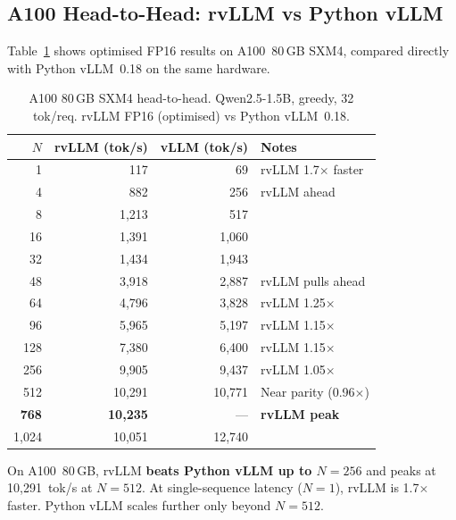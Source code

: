 \documentclass[11pt,a4paper]{article}
\newcommand{\thead}[1]{\textbf{#1}}
\begin{document}
\subsection{A100 Head-to-Head: rvLLM vs Python vLLM}

Table~\ref{tab:a100} shows optimised FP16 results on A100~80\,GB SXM4, compared
directly with Python vLLM~0.18 on the same hardware.

\begin{table}[t]
  \centering
  \caption{A100 80\,GB SXM4 head-to-head. Qwen2.5-1.5B, greedy, 32 tok/req. rvLLM FP16 (optimised) vs Python vLLM~0.18.}
  \label{tab:a100}
  \small
  \begin{tabular}{@{}rrrp{3.5cm}@{}}
    \toprule
    \rowcolor{HeaderBlue} \thead{$N$} & \thead{rvLLM (tok/s)} & \thead{vLLM (tok/s)} & \thead{Notes} \\
    \midrule
    1    & 117    & 69     & rvLLM 1.7$\times$ faster \\
    \rowcolor{gray!8}
    4    & 882    & 256    & rvLLM ahead \\
    8    & 1{,}213 & 517   & \\
    \rowcolor{gray!8}
    16   & 1{,}391 & 1{,}060 & \\
    32   & 1{,}434 & 1{,}943 & \\
    \rowcolor{gray!8}
    48   & 3{,}918 & 2{,}887 & rvLLM pulls ahead \\
    64   & 4{,}796 & 3{,}828 & rvLLM 1.25$\times$ \\
    \rowcolor{gray!8}
    96   & 5{,}965 & 5{,}197 & rvLLM 1.15$\times$ \\
    128  & 7{,}380 & 6{,}400 & rvLLM 1.15$\times$ \\
    \rowcolor{gray!8}
    256  & 9{,}905 & 9{,}437 & rvLLM 1.05$\times$ \\
    512  & 10{,}291 & 10{,}771 & Near parity (0.96$\times$) \\
    \rowcolor{gray!8}
    \textbf{768} & \textbf{10{,}235} & --- & \textbf{rvLLM peak} \\
    1{,}024 & 10{,}051 & 12{,}740 & \\
    \bottomrule
  \end{tabular}
\end{table}

On A100~80\,GB, rvLLM \textbf{beats Python vLLM up to $N\!=\!256$} and peaks at
10{,}291~tok/s at $N\!=\!512$. At single-sequence latency ($N\!=\!1$), rvLLM is
1.7$\times$ faster. Python vLLM scales further only beyond $N\!=\!512$.
\end{document}
